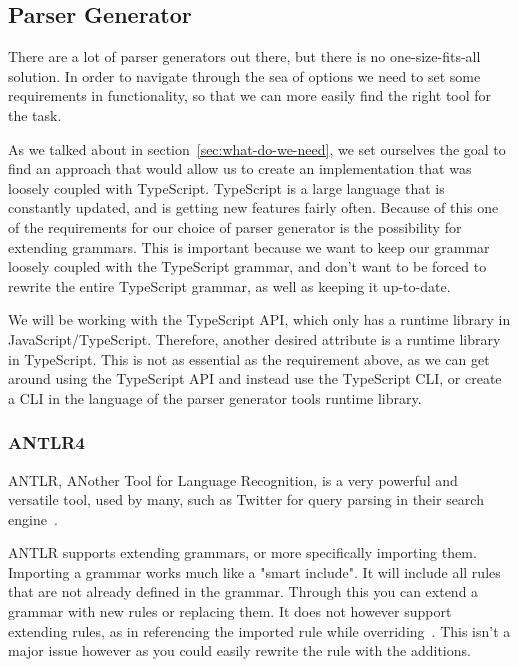 

\subsection{Parser Generator}\label{subsec:parser-generator}

There are a lot of parser generators out there, but there is no one-size-fits-all solution.
In order to navigate through the sea of options we need to set some requirements in functionality, so that we can more easily find the right tool for the task.

As we talked about in section~\vref{sec:what-do-we-need}, we set ourselves the goal to find an approach that would allow us to create an implementation that was loosely coupled with TypeScript.
TypeScript is a large language that is constantly updated, and is getting new features fairly often.
Because of this one of the requirements for our choice of parser generator is the possibility for extending grammars.
This is important because we want to keep our grammar loosely coupled with the TypeScript grammar, and don't want to be forced to rewrite the entire TypeScript grammar, as well as keeping it up-to-date.

We will be working with the TypeScript API, which only has a runtime library in JavaScript/TypeScript.
Therefore, another desired attribute is a runtime library in TypeScript.
This is not as essential as the requirement above, as we can get around using the TypeScript API and instead use the TypeScript CLI, or create a CLI in the language of the parser generator tools runtime library.


\subsubsection{ANTLR4}\label{subsubsec:antlr}

ANTLR, ANother Tool for Language Recognition, is a very powerful and versatile tool, used by many, such as Twitter for query parsing in their search engine~\cite{Terence2012}.

ANTLR supports extending grammars, or more specifically importing them.
Importing a grammar works much like a "smart include".
It will include all rules that are not already defined in the grammar.
Through this you can extend a grammar with new rules or replacing them.
It does not however support extending rules, as in referencing the imported rule while overriding~\cite{Terence2012}.
This isn't a major issue however as you could easily rewrite the rule with the additions.

